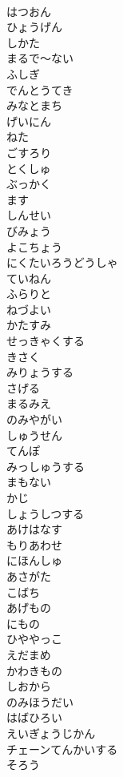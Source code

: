 \documentclass[8pt]{extreport}
\begin{document}
\begin{CJK}{UTF8}{min}
\\	はつおん
\\	ひょうげん
\\	しかた
\\	まるで～ない
\\	ふしぎ
\\	でんとうてき
\\	みなとまち
\\	げいにん
\\	ねた
\\	ごすろり
\\	とくしゅ
\\	ぶっかく
\\	ます
\\	しんせい
\\	びみょう
\\	よこちょう
\\	にくたいろうどうしゃ
\\	ていねん
\\	ふらりと
\\	ねづよい
\\	かたすみ
\\	せっきゃくする
\\	きさく
\\	みりょうする
\\	さげる
\\	まるみえ
\\	のみやがい
\\	しゅうせん
\\	てんぽ
\\	みっしゅうする
\\	まもない
\\	かじ
\\	しょうしつする
\\	あけはなす
\\	もりあわせ
\\	にほんしゅ
\\	あさがた
\\	こばち
\\	あげもの
\\	にもの
\\	ひややっこ
\\	えだまめ
\\	かわきもの
\\	しおから
\\	のみほうだい
\\	はばひろい
\\	えいぎょうじかん
\\	チェーンてんかいする
\\	そろう

\end{CJK}
\end{document}
